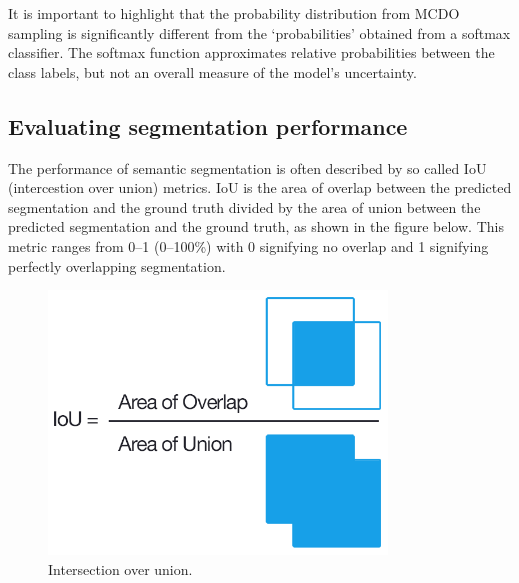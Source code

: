 It is important to highlight that the probability distribution from MCDO sampling is significantly different from the ‘probabilities’ obtained from a softmax classifier. The softmax function approximates relative probabilities between the class labels, but not an overall measure of the model’s uncertainty. \cite{bayesian}

\subsection{Evaluating segmentation performance}

The performance of semantic segmentation is often described by so called IoU (intercestion over union) metrics. IoU is the area of overlap between the predicted segmentation and the ground truth divided by the area of union between the predicted segmentation and the ground truth, as shown in the figure below. This metric ranges from 0–1 (0–100\%) with 0 signifying no overlap and 1 signifying perfectly overlapping segmentation.

\vspace{4mm}
\begin{figure}[h]
	\begin{center}
		\includegraphics*[width=9cm, keepaspectratio]{obr/iou.png}
	\end{center}
	\vspace{4mm}
	\caption{Intersection over union. \cite{iou}} 
	\label{iou}
\end{figure}




